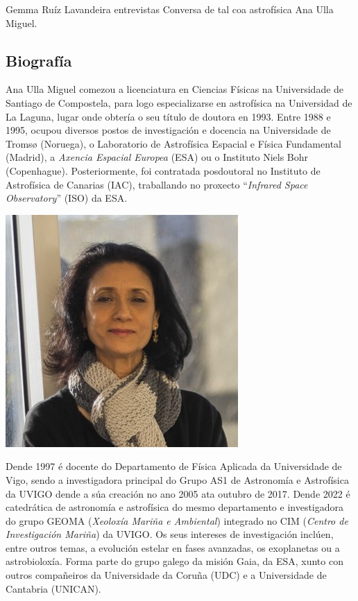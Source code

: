 \Titular*%
{Coñecendo a Ana Ulla Miguel}%
{Gemma Ruíz Lavandeira}%
{entrevistas}%
{Conversa de tal coa astrofísica Ana Ulla Miguel.}%

\begin{refsection}
\begin{multicols}{2}

\subsection*{Biografía}
Ana Ulla Miguel comezou a licenciatura en Ciencias Físicas na Universidade de
Santiago de Compostela, para logo especializarse en astrofísica na Universidad
de La Laguna, lugar onde obtería o seu título de doutora en 1993. Entre 1988 e
1995, ocupou diversos postos de investigación e docencia na Universidade de
Tromsø (Noruega), o Laboratorio de Astrofísica Espacial e Física Fundamental
(Madrid), a \textit{Axencia Espacial Europea} (ESA) ou o Instituto Niels Bohr
(Copenhague). Posteriormente, foi contratada posdoutoral no Instituto de
Astrofísica de Canarias (IAC), traballando no proxecto ``\textit{Infrared
Space Observatory}'' (ISO) da ESA.

\begin{center}
    \includegraphics[width=0.85\linewidth]{revistas/002/imaxes/PHOTO-2025-04-30-18-18-48.jpg}
\end{center}

Dende 1997 é docente do Departamento de Física Aplicada da Universidade de
Vigo, sendo a investigadora principal do Grupo AS1 de Astronomía e Astrofísica
da UVIGO dende a súa creación no ano 2005 ata outubro de 2017. Dende 2022 é
catedrática de astronomía e astrofísica do mesmo departamento e investigadora
do grupo GEOMA (\textit{Xeoloxía Mariña e Ambiental}) integrado no CIM
(\textit{Centro de Investigación Mariña}) da UVIGO. Os seus intereses de
investigación inclúen, entre outros temas, a evolución estelar en fases
avanzadas, os exoplanetas ou a astrobioloxía. Forma parte do grupo galego da
misión Gaia, da ESA, xunto con outros compañeiros da Universidade da Coruña
(UDC) e a Universidade de Cantabria (UNICAN).


\end{multicols}
\end{refsection}
